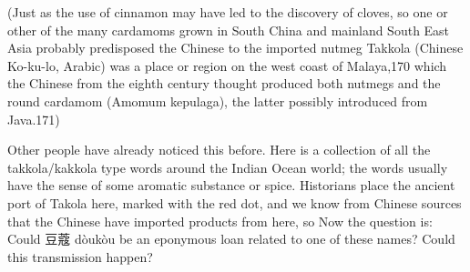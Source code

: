 \documentclass[12pt]{article}
\begin{document}
(Just as the use of cinnamon may have led to the discovery of cloves, so one or other of the many cardamoms grown in South China and mainland South East Asia probably predisposed the Chinese to the imported nutmeg Takkola (Chinese Ko-ku-lo, Arabic) was a place or region on the west coast of Malaya,170 which the Chinese from the eighth century thought produced both nutmegs and the round cardamom (Amomum kepulaga), the latter possibly introduced from Java.171)



Other people have already noticed this before. Here is a collection of all the takkola/kakkola type words around the Indian Ocean world; the words usually have the sense of some aromatic substance or spice. 
Historians place the ancient port of Takola here, marked with the red dot, and we know from Chinese sources that the Chinese have imported products from here, so
Now the question is: Could 豆蔻 dòukòu be an eponymous loan related to one of these names? Could this transmission happen?









\printbibliography
\end{document}
